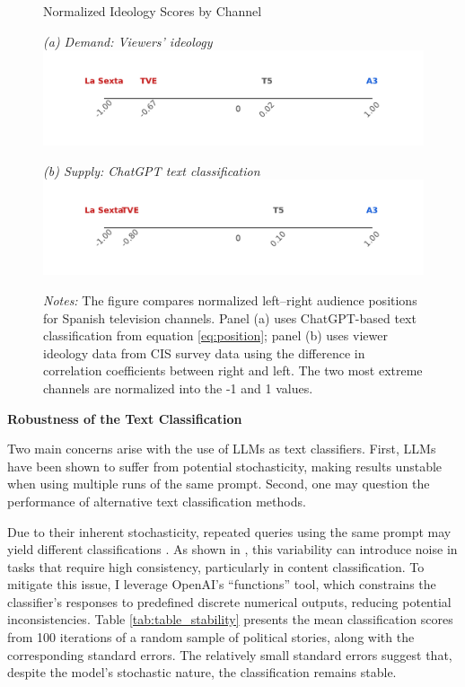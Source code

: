 \documentclass[12pt]{article}
\begin{document}
	
		\begin{figure}[ht]
		\centering
		\caption{Normalized Ideology Scores by Channel}
		\begin{minipage}[t]{0.48\textwidth}
			\centering
					\textit{(a) Demand: Viewers' ideology}
		\includegraphics[width=\linewidth]{figures/congress_line_cis}
		\end{minipage}
		\hfill
		\begin{minipage}[t]{0.48\textwidth}
			\centering

			
				\textit{(b) Supply: ChatGPT text classification}
			\includegraphics[width=\linewidth]{figures/congress_line_chatgpt}
			
			
		\end{minipage}
		
		
		\caption*{\small \textit{Notes:} The figure compares normalized left–right audience positions for Spanish television channels. Panel (a) uses ChatGPT-based text classification from equation \ref{eq:position}; panel (b) uses viewer ideology data from CIS survey data using the difference in correlation coefficients between right and left. The two most extreme channels are normalized into the -1 and 1 values. }
		\label{fig:channel_ideology_lines}
	\end{figure}
	
	
\textbf{Robustness of the Text Classification}

Two main concerns arise with the use of LLMs as text classifiers. First, LLMs have been shown to suffer from potential stochasticity, making results unstable when using multiple runs of the same prompt. Second, one may question the performance of alternative text classification methods.

Due to their inherent stochasticity, repeated queries using the same prompt may yield different classifications \citep{llmstability2024}. As shown in \citep{llmclassification2024}, this variability can introduce noise in tasks that require high consistency, particularly in content classification. To mitigate this issue, I leverage OpenAI’s “functions” tool, which constrains the classifier’s responses to predefined discrete numerical outputs, reducing potential inconsistencies. Table \ref{tab:table_stability} presents the mean classification scores from 100 iterations of a random sample of political stories, along with the corresponding standard errors. The relatively small standard errors suggest that, despite the model’s stochastic nature, the classification remains stable.
\end{document}
